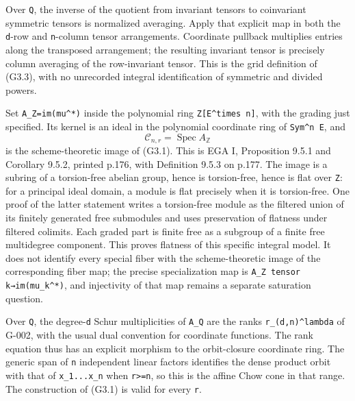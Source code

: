 \documentclass[
  10pt,
]{article}
\begin{document}
Over \texttt{\small Q}, the inverse of the quotient from invariant
tensors to coinvariant symmetric tensors is normalized averaging. Apply
that explicit map in both the \texttt{\small d}-row and
\texttt{\small n}-column tensor arrangements. Coordinate pullback
multiplies entries along the transposed arrangement; the resulting
invariant tensor is precisely column averaging of the row-invariant
tensor. This is the grid definition of (G3.3), with no unrecorded
integral identification of symmetric and divided powers.

Set
\texttt{\small A\_\allowbreak{}Z=\allowbreak{}im(\allowbreak{}mu\textasciicircum{}*)\allowbreak{}}
inside the polynomial ring
\texttt{\small Z[\allowbreak{}E\textasciicircum{}times n]\allowbreak{}},
with the grading just specified. Its kernel is an ideal in the
polynomial coordinate ring of \texttt{\small Sym\textasciicircum{}n E},
and \[
\mathcal C_{n,r}=\operatorname{Spec}A_{\mathbb Z}
\] is the scheme-theoretic image of (G3.1). This is EGA I, Proposition
9.5.1 and Corollary 9.5.2, printed p.176, with Definition 9.5.3 on
p.177. The image is a subring of a torsion-free abelian group, hence is
torsion-free, hence is flat over \texttt{\small Z}: for a principal
ideal domain, a module is flat precisely when it is torsion-free. One
proof of the latter statement writes a torsion-free module as the
filtered union of its finitely generated free submodules and uses
preservation of flatness under filtered colimits. Each graded part is
finite free as a subgroup of a finite free multidegree component. This
proves flatness of this specific integral model. It does not identify
every special fiber with the scheme-theoretic image of the corresponding
fiber map; the precise specialization map is
\texttt{\small A\_\allowbreak{}Z tensor k→\allowbreak{}im(\allowbreak{}mu\_\allowbreak{}k\textasciicircum{}*)\allowbreak{}},
and injectivity of that map remains a separate saturation question.

Over \texttt{\small Q}, the degree-\texttt{\small d} Schur
multiplicities of \texttt{\small A\_\allowbreak{}Q} are the ranks
\texttt{\small r\_\allowbreak{}(\allowbreak{}d,\allowbreak{}n)\allowbreak{}\textasciicircum{}lambda}
of G-002, with the usual dual convention for coordinate functions. The
rank equation thus has an explicit morphism to the orbit-closure
coordinate ring. The generic span of \texttt{\small n} independent
linear factors identifies the dense product orbit with that of
\texttt{\small x\_\allowbreak{}1...x\_\allowbreak{}n} when
\texttt{\small r>=\allowbreak{}n}, so this is the affine Chow cone in
that range. The construction of (G3.1) is valid for every
\texttt{\small r}.
\end{document}
